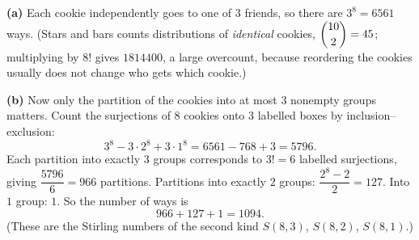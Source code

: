 \textbf{(a)} Each cookie independently goes to one of $3$ friends, so there are $3^8=\boxed{6561}$ ways. (Stars and bars counts distributions of \emph{identical} cookies, $\dbinom{10}{2}=45$; multiplying by $8!$ gives $1814400$, a large overcount, because reordering the cookies usually does not change who gets which cookie.)

\textbf{(b)} Now only the partition of the cookies into at most $3$ nonempty groups matters. Count the surjections of $8$ cookies onto $3$ labelled boxes by inclusion--exclusion:
\[
3^8-3\cdot2^8+3\cdot1^8=6561-768+3=5796 .
\]
Each partition into exactly $3$ groups corresponds to $3!=6$ labelled surjections, giving $\dfrac{5796}{6}=966$ partitions. Partitions into exactly $2$ groups: $\dfrac{2^8-2}{2}=127$. Into $1$ group: $1$. So the number of ways is
\[
966+127+1=\boxed{1094}.
\]
(These are the Stirling numbers of the second kind $S(8,3)$, $S(8,2)$, $S(8,1)$.)
